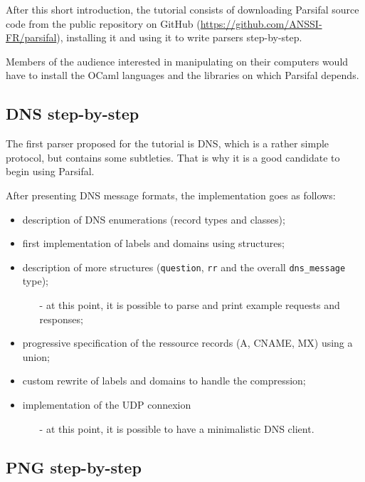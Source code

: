 \documentclass{article}
\begin{document}
After this short introduction, the tutorial consists of downloading
Parsifal source code from the public repository on GitHub
(\url{https://github.com/ANSSI-FR/parsifal}), installing it and using
it to write parsers step-by-step.

Members of the audience interested in manipulating on their
computers would have to install the OCaml languages and the libraries
on which Parsifal depends.


\subsection{DNS step-by-step}

The first parser proposed for the tutorial is DNS, which is a rather
simple protocol, but contains some subtleties. That is why it is a
good candidate to begin using Parsifal.

After presenting DNS message formats, the implementation goes as
follows:
\begin{itemize}
\item description of DNS enumerations (record types and classes);
\item first implementation of labels and domains using structures;
\item description of more structures (\texttt{question}, \texttt{rr}
  and the overall \texttt{dns\_message} type);
\begin{itemize}
\item[-] at this point, it is possible to parse and print example
  requests and responses;
\end{itemize}
\item progressive specification of the ressource records (A, CNAME,
  MX) using a union;
\item custom rewrite of labels and domains to handle the compression;
\item implementation of the UDP connexion
\begin{itemize}
\item[-] at this point, it is possible to have a minimalistic DNS client.
\end{itemize}
\end{itemize}


\subsection{PNG step-by-step}
\end{document}
